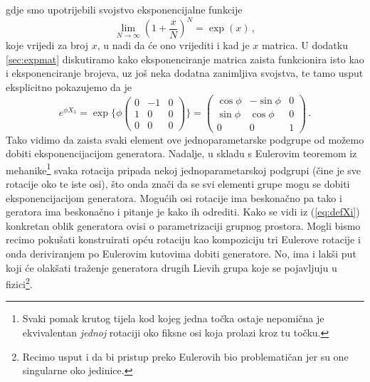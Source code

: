 gdje smo upotrijebili svojstvo eksponencijalne funkcije
\begin{equation}
    \lim_{N\to\infty}\left(1 + \frac{x}{N}\right)^N = \exp(x) \,,
\end{equation}
koje vrijedi za broj $x$,
u nadi da će ono vrijediti i kad je $x$ matrica.
U dodatku \ref{sec:expmat} diskutiramo
kako eksponenciranje matrica zaista funkcionira isto kao i
eksponenciranje brojeva, uz još neka dodatna zanimljiva svojstva,
te tamo usput eksplicitno pokazujemo da je
\begin{equation}
e^{\phi X_3} = \exp\Bigg\{ 
    \phi  \begin{pmatrix}
0 & -1 & 0 \\
1 & 0 & 0 \\
0 & 0 & 0 
\end{pmatrix}\Bigg\} =
\begin{pmatrix}
\cos\phi & -\sin\phi & 0 \\
\sin\phi & \cos\phi & 0 \\
0 & 0 & 1 \end{pmatrix} \,.
\end{equation}
Tako vidimo da zaista svaki element ove jednoparametarske podgrupe
od  možemo dobiti eksponencijacijom generatora.
Nadalje, u skladu s Eulerovim teoremom iz mehanike\footnote{Svaki pomak krutog
tijela kod kojeg jedna točka ostaje nepomična je ekvivalentan \emph{jednoj}
rotaciji oko fiksne osi koja prolazi kroz tu točku.} svaka  rotacija 
pripada nekoj jednoparametarskoj podgrupi
 (čine je sve rotacije oko te iste osi), što onda znači da se
svi elementi grupe  mogu se dobiti eksponencijacijom generatora.
Mogućih osi rotacije ima beskonačno pa tako i geratora ima beskonačno
i pitanje je kako ih odrediti.
Kako se vidi iz (\ref{eq:defXi}) konkretan oblik generatora ovisi
o parametrizaciji grupnog prostora. 
Mogli bismo recimo pokušati konstruirati opću rotaciju kao kompoziciju tri
 Eulerove rotacije i onda deriviranjem po Eulerovim kutovima dobiti
 generatore. No, ima i lakši put koji će olakšati traženje 
 generatora drugih Lievih grupa koje se pojavljuju u fizici\footnote{Recimo
     usput i da bi pristup preko Eulerovih
     bio  problematičan jer su one singularne oko jedinice.}.

